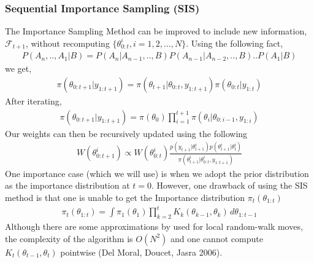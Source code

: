 \documentclass[11pt]{article}
\theoremstyle{definition}
\begin{document}
\subsubsection{Sequential Importance Sampling (SIS)}
The Importance Sampling Method can be improved to include new information, $\mathcal{F}_{t+1}$, without recomputing $\{\theta_{0:t}^{i},i=1,2,...,N\}$. Using the following fact,
\begin{equation}
	\begin{aligned}
		P(A_{n},..,A_{1}|B) = P(A_{n}|A_{n-1},..,B)P(A_{n-1}|A_{n-2},..,B)..P(A_{1}|B)
	\end{aligned}
\end{equation}
we get,
\begin{equation}
	\begin{aligned}
		\pi(\theta_{0:t+1}|y_{1:t+1}) = \pi(\theta_{t+1}|\theta_{0:t},y_{1:t+1})\pi(\theta_{0:t}|y_{1:t})
	\end{aligned}
\end{equation}
After iterating,
\begin{equation}
	\begin{aligned}
		\pi(\theta_{0:t+1}|y_{1:t+1}) = \pi(\theta_{0})\prod_{i=1}^{t+1}\pi(\theta_{i}|\theta_{0:i-1},y_{1:i})
	\end{aligned}
\end{equation}
Our weights can then be recursively updated using the following
\begin{equation}
	\begin{aligned}
		W(\theta_{0:t+1}^{i}) \propto W(\theta_{0:t}^{i}) \frac{p(y_{t+1}|\theta_{t+1}^{i})p(\theta_{t+1}^{i}|\theta_{t}^{i})}{\pi(\theta_{t+1}^{i}|\theta_{0:t}^{i},y_{1:t+1})}
	\end{aligned}
\end{equation}
One importance case (which we will use) is when we adopt the prior distribution as the importance distribution at $t=0$. However, one drawback of using the SIS method is that one is unable to get the Importance distribution $\pi_{t}(\theta_{1:t})$
\begin{equation}
	\begin{aligned}
		\pi_{t}(\theta_{1:t}) = \int \pi_{1}(\theta_{1})\prod_{k=2}^{t}K_{k}(\theta_{k-1},\theta_{k}) \,d\theta_{1:t-1}
	\end{aligned}
\end{equation}
Although there are some approximations by used for local random-walk moves, the complexity of the algorithm is $O(N^2)$ and one cannot compute $K_{t}(\theta_{t-1},\theta_{t})$ pointwise (Del Moral, Doucet, Jasra 2006).
\end{document}
